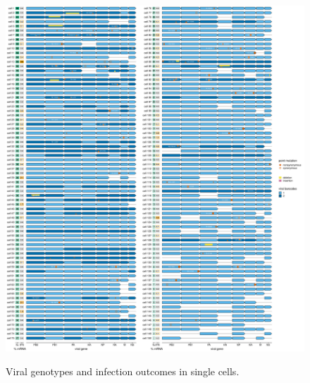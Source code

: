 \documentclass[9pt,lineno]{elife}
\begin{document}
\begin{figure}
\begin{fullwidth}
{\centering
\includegraphics[height=0.9\textheight]{figures/single_cell_figures/p_genotypes.pdf}
}
\caption{
Viral genotypes and infection outcomes in single cells.
}
\label{fig:genotypes}


\end{fullwidth}
\end{figure}
\end{document}
